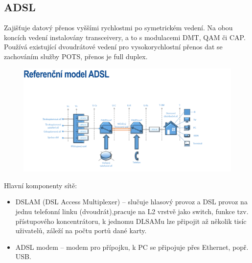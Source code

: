 \subsection{ADSL}
Zajišťuje datový přenos vyššími rychlostmi po symetrickém vedení. Na obou koncích vedení instalovány transceivery, a to s modulacemi DMT, QAM či CAP. Používá existující dvoudrátové vedení pro vysokorychlostní přenos dat se zachováním služby POTS, přenos je full duplex.
\begin{figure} [h]
    \centering
    \includegraphics[width=1\textwidth]{snimky/ADSL model.png}
    \label{fig:uml}
\end{figure}

Hlavní komponenty sítě:
\begin{itemize}
    \item DSLAM (DSL Access Multiplexer) -- slučuje hlasový provoz a DSL provoz na jednu telefonní linku (dvoudrát),pracuje na L2 vrstvě jako switch, funkce tzv. přístupového koncentrátoru, k jednomu DLSAMu lze připojit až několik tisíc uživatelů, záleží na počtu portů dané karty.
    \item ADSL modem -- modem pro přípojku, k PC se připojuje přes Ethernet, popř. USB.
\end{itemize}

